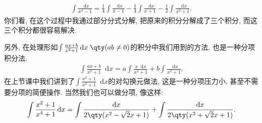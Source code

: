 \documentclass{ctexbook}
\newcommand*{\dif}{\mathop{}\!\mathrm{d}}
\begin{document}
{\begin{align*}
\int\frac{\dif{x}}{x^{4}-1}=\frac{1}{4}\int\frac{\dif{x}}{x-1}-\frac{1}{4}\int\frac{\dif{x}}{x+1}-\frac{1}{2}\int\frac{\dif{x}}{x^{2}+1}
.\end{align*}
你们看, 在这个过程中我通过部分分式分解, 把原来的积分分解成了三个积分, 而这三个积分都很容易解决. \par
另外, 在处理形如$\int\frac{ax+b}{x^{2}+1}\dif{x}\;\qty(ab\ne0)$的积分中我们用到的方法, 也是一种分项积分法. 
\begin{align*}
\int\frac{ax+b}{x^{2}+1}\dif{x}=a\int\frac{x\dif{x}}{x^{2}+1}+b\int\frac{\dif{x}}{x^{2}+1}
.\end{align*}
在上节课中我们讲到了$\int\frac{x^{2}+1}{x^{4}+1}\dif{x}$的对勾换元做法, 这是一种分项压力小, 甚至不需要分项的简便操作. 当然我们也可以做分项, 像这样: 
\begin{align*}
\int\frac{x^{2}+1}{x^{4}+1}\dif{x}=\int\frac{\dif{x}}{2\qty(x^{2}-\sqrt{2}x+1)}+\int\frac{\dif{x}}{2\qty(x^{2}+\sqrt{2}x+1)}
.\end{align*}
}
\end{document}
